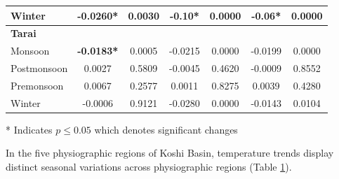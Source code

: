 \begin{table}[htbp]
\begin{tabular}{@{}lcccccc@{}}
      Winter & \textbf{-0.0260*} & 0.0030 & \textbf{-0.10*} & 0.0000 & \textbf{-0.06*} & 0.0000 \\ 
      \midrule
      \textbf{Tarai} & & & & & & \\ 
      Monsoon & \textbf{-0.0183*} & 0.0005 & -0.0215 & 0.0000 & -0.0199 & 0.0000 \\ 
      Postmonsoon & 0.0027 & 0.5809 & -0.0045 & 0.4620 & -0.0009 & 0.8552 \\ 
      Premonsoon & 0.0067 & 0.2577 & 0.0011 & 0.8275 & 0.0039 & 0.4280 \\ 
      Winter & -0.0006 & 0.9121 & -0.0280 & 0.0000 & -0.0143 & 0.0104 \\ 
      \bottomrule
  \end{tabular}
  \label{tab:spatial_trends}
  \begin{flushleft}
    \footnotesize{* Indicates \( p \leq 0.05 \) which denotes significant changes} \\
    
\end{flushleft}
\end{table}




In the five physiographic regions of Koshi Basin, temperature trends display distinct seasonal variations across physiographic regions (Table \ref{tab:spatial_trends}).

